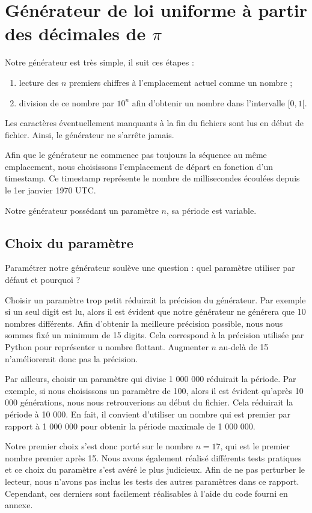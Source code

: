 \documentclass[10pt,a4paper]{article}
\begin{document}
	\newpage
	\section{Générateur de loi uniforme à partir des décimales de $\pi$}
	Notre générateur est très simple, il suit ces étapes :
	\begin{enumerate}
		\item lecture des $n$ premiers chiffres à l'emplacement actuel comme un nombre ;
		\item division de ce nombre par $10^{n}$ afin d'obtenir un nombre dans l'intervalle $[0, 1[$.
	\end{enumerate}
	Les caractères éventuellement manquants à la fin du fichiers sont lus en début de fichier. Ainsi, le générateur ne s'arrête jamais.
	
	Afin que le générateur ne commence pas toujours la séquence au même emplacement, nous choisissons l'emplacement de départ en fonction d'un timestamp.
	Ce timestamp représente le nombre de millisecondes écoulées depuis le 1er janvier 1970 UTC.
	
	Notre générateur possédant un paramètre $n$, sa période est variable.
	
	\subsection{Choix du paramètre}
	Paramétrer notre générateur soulève une question : quel paramètre utiliser par défaut et pourquoi ?
	
	Choisir un paramètre trop petit réduirait la précision du générateur.
	Par exemple si un seul digit est lu, alors il est évident que notre générateur ne générera que 10 nombres différents.
	Afin d'obtenir la meilleure précision possible, nous nous sommes fixé un minimum de 15 digits.
	Cela correspond à la précision utilisée par Python pour représenter u nombre flottant.
	Augmenter $n$ au-delà de 15 n'améliorerait donc pas la précision.
	
	Par ailleurs, choisir un paramètre qui divise 1 000 000 réduirait la période.
	Par exemple, si nous choisissons un paramètre de 100, alors il est évident qu'après 10 000 générations, nous nous retrouverions au début du fichier.
	Cela réduirait la période à 10 000.
	En fait, il convient d'utiliser un nombre qui est premier par rapport à 1 000 000 pour obtenir la période maximale de 1 000 000.
	
	Notre premier choix s'est donc porté sur le nombre $n = 17$, qui est le premier nombre premier après 15.
	Nous avons également réalisé différents tests pratiques et ce choix du paramètre s'est avéré le plus judicieux.
	Afin de ne pas perturber le lecteur, nous n'avons pas inclus les tests des autres paramètres dans ce rapport.
	Cependant, ces derniers sont facilement réalisables à l'aide du code fourni en annexe.
	
\end{document}
